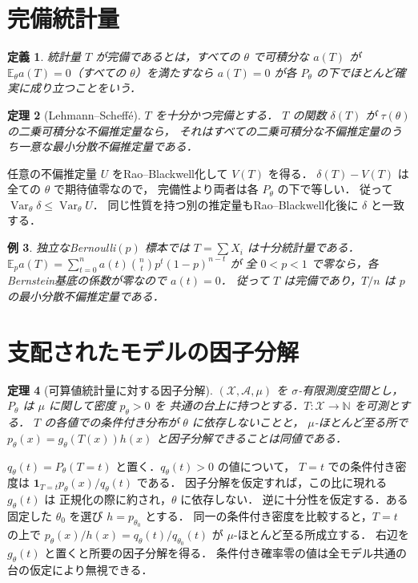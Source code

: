 \documentclass[a5paper,10pt,onecolumn]{jsarticle}
\makeatletter
\theoremstyle{mathnotetheorem}
\newtheorem{theorem}{定理}[section]
\newtheorem{definition}[theorem]{定義}
\newtheorem{example}[theorem]{例}
\renewcommand{\proofname}{証明}
\renewenvironment{proof}[1][\proofname]{%
  \par\pushQED{\qed}\normalfont\topsep4\p@\@plus2\p@\relax
  \trivlist\item[\hskip\labelsep\bfseries #1]\ignorespaces
}{\popQED\endtrivlist\@endpefalse}
\makeatother
\begin{document}
\section{完備統計量}
\begin{definition}
統計量 $T$ が完備であるとは，すべての $\theta$ で可積分な $a(T)$ が
$\mathbb E_\theta a(T)=0$（すべての $\theta$）を満たすなら
$a(T)=0$ が各 $P_\theta$ の下でほとんど確実に成り立つことをいう．
\end{definition}
\begin{theorem}[Lehmann--Scheff\'e]
$T$ を十分かつ完備とする．
$T$ の関数 $\delta(T)$ が $\tau(\theta)$ の二乗可積分な不偏推定量なら，
それはすべての二乗可積分な不偏推定量のうち一意な最小分散不偏推定量である．
\end{theorem}
\begin{proof}
任意の不偏推定量 $U$ をRao--Blackwell化して $V(T)$ を得る．
$\delta(T)-V(T)$ は全ての $\theta$ で期待値零なので，
完備性より両者は各 $P_\theta$ の下で等しい．
従って $\operatorname{Var}_\theta\delta\le\operatorname{Var}_\theta U$．
同じ性質を持つ別の推定量もRao--Blackwell化後に $\delta$ と一致する．
\end{proof}
\begin{example}
独立なBernoulli$(p)$ 標本では $T=\sum X_i$ は十分統計量である．
$\mathbb E_p a(T)=\sum_{t=0}^n a(t){n\choose t}p^t(1-p)^{n-t}$ が
全 $0<p<1$ で零なら，各Bernstein基底の係数が零なので $a(t)=0$．
従って $T$ は完備であり，$T/n$ は $p$ の最小分散不偏推定量である．
\end{example}


\section{支配されたモデルの因子分解}
\begin{theorem}[可算値統計量に対する因子分解]
$(\mathcal X,\mathcal A,\mu)$ を $\sigma$-有限測度空間とし，
$P_\theta$ は $\mu$ に関して密度 $p_\theta>0$ を
共通の台上に持つとする．$T:\mathcal X\to\mathbb N$ を可測とする．
$T$ の各値での条件付き分布が $\theta$ に依存しないことと，
$\mu$-ほとんど至る所で
$p_\theta(x)=g_\theta(T(x))h(x)$ と因子分解できることは同値である．
\end{theorem}
\begin{proof}
$q_\theta(t)=P_\theta(T=t)$ と置く．$q_\theta(t)>0$ の値について，
$T=t$ での条件付き密度は
$\mathbf1_{T=t}p_\theta(x)/q_\theta(t)$ である．
因子分解を仮定すれば，この比に現れる $g_\theta(t)$ は
正規化の際に約され，$\theta$ に依存しない．
逆に十分性を仮定する．ある固定した $\theta_0$ を選び
$h=p_{\theta_0}$ とする．
同一の条件付き密度を比較すると，$T=t$ の上で
$p_\theta(x)/h(x)=q_\theta(t)/q_{\theta_0}(t)$ が
$\mu$-ほとんど至る所成立する．
右辺を $g_\theta(t)$ と置くと所要の因子分解を得る．
条件付き確率零の値は全モデル共通の台の仮定により無視できる．
\end{proof}
\end{document}
